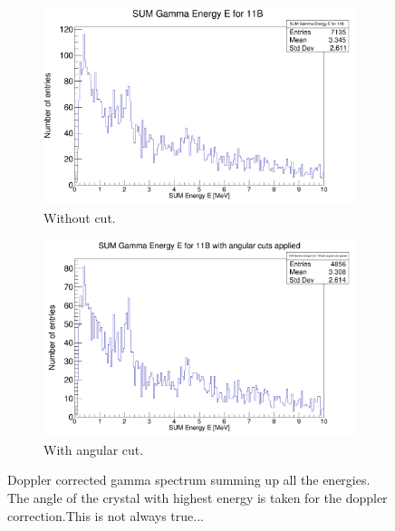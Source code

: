 \documentclass{report}
\begin{document}
\begin{figure}[ht]
\begin{subfigure}{.5\textwidth}
  \centering
  \includegraphics[width=\linewidth]{gamma_sum.png}
  \caption{Without cut.}
  \label{fig:sub-first}
\end{subfigure}
\begin{subfigure}{.5\textwidth}
  \centering
  \includegraphics[width=\linewidth]{gamma_sum_cut.png}
  \caption{With angular cut.}
  \label{fig:sub-second}
\end{subfigure}
\caption{Doppler corrected gamma spectrum summing up all the energies. The angle of the crystal with highest energy is taken for the doppler correction.This is not always true...}
\label{fig:gamma_sum_cut}
\end{figure}
\end{document}
